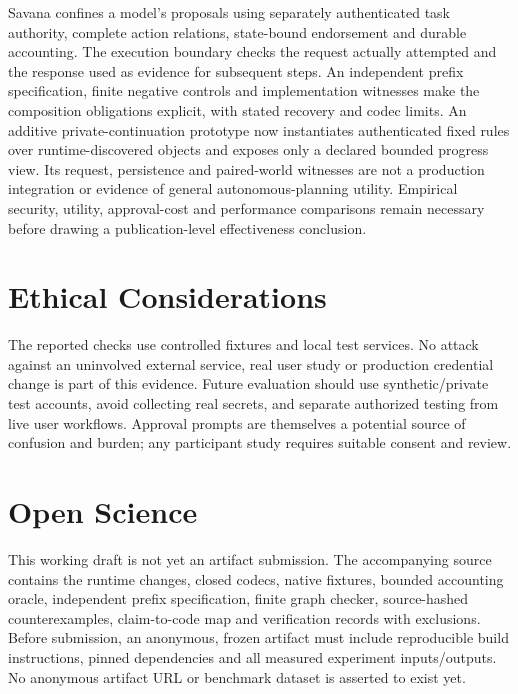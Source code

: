 \documentclass[letterpaper,twocolumn,10pt]{article}
\newcommand{\sys}{Savana}
\begin{document}
\sys{} confines a model's proposals using separately authenticated task authority,
complete action relations, state-bound endorsement and durable accounting.
The execution boundary checks the request actually attempted and the response
used as evidence for subsequent steps. An independent prefix specification,
finite negative controls and implementation witnesses make the composition
obligations explicit, with stated recovery and codec limits. An additive
private-continuation prototype now instantiates authenticated fixed rules over
runtime-discovered objects and exposes only a declared bounded progress view.
Its request, persistence and paired-world witnesses are not a production
integration or evidence of general autonomous-planning utility.
Empirical security, utility, approval-cost and performance comparisons remain
necessary before drawing a publication-level effectiveness conclusion.




\appendix
\section{Ethical Considerations}

The reported checks use controlled fixtures and local test services. No attack
against an uninvolved external service, real user study or production credential
change is part of this evidence. Future evaluation should use synthetic/private
test accounts, avoid collecting real secrets, and separate authorized testing
from live user workflows. Approval prompts are themselves a potential source of
confusion and burden; any participant study requires suitable consent and review.

\section{Open Science}

This working draft is not yet an artifact submission. The accompanying source
contains the runtime changes, closed codecs, native fixtures, bounded accounting
oracle, independent prefix specification, finite graph checker, source-hashed
counterexamples, claim-to-code map and verification records with exclusions.
Before submission, an anonymous, frozen artifact must include reproducible build
instructions, pinned dependencies and all measured experiment inputs/outputs.
No anonymous artifact URL or benchmark dataset is asserted to exist yet.
\end{document}
